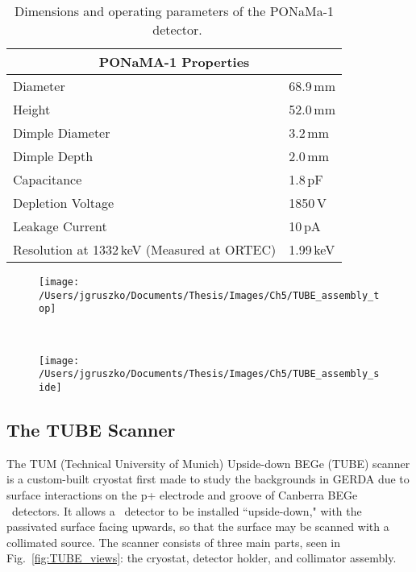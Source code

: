 \begin{table}[]
\centering
\begin{tabular}{p{5cm} | l}
\hline
\multicolumn{2}{c}{PONaMA-1 Properties} \\
\hline
Diameter & 68.9\,mm \\ 
Height & 52.0\,mm \\ 
Dimple Diameter & 3.2\,mm \\
Dimple Depth & 2.0\,mm \\
Capacitance & 1.8\,pF \\
Depletion Voltage & 1850\,V \\
Leakage Current & 10\,pA \\
Resolution at 1332\,keV \newline (Measured at ORTEC) & 1.99\,keV \\
\end{tabular}
\caption{Dimensions and operating parameters of the PONaMa-1 \ppc\ detector.}
 \label{tab:PONaMA_specs}
\end{table}

\begin{figure*}[p]
 \centering
  \begin{subfigure}[]{\textwidth}
  \centering
 \texttt{[image: /Users/jgruszko/Documents/Thesis/Images/Ch5/TUBE\_assembly\_top]}
 \label{fig:TUBE_top}
\end{subfigure}
  ~
  \begin{subfigure}[]{\textwidth}
   \centering
 \texttt{[image: /Users/jgruszko/Documents/Thesis/Images/Ch5/TUBE\_assembly\_side]}
 \label{fig:TUBE_side}
 \end{subfigure}
\caption[A diagram of the TUBE scanner]{Simplified top {\it (top)} and bisected views {\it (bottom)} of the TUBE scanner, showing key dimensions. The thermal braids connecting the IR umbrella to the IR cup and the mylar covering of the IR umbrella are not shown. Details of the detector cup, front-end electronics, and cold-finger are also removed for clarity.}
\label{fig:TUBE_views}
\end{figure*}

\subsection{The TUBE Scanner}
The TUM (Technical University of Munich) Upside-down BEGe (TUBE) scanner is a custom-built cryostat first made to study the backgrounds in GERDA due to surface interactions on the p+ electrode and groove of Canberra BEGe \ppc\ detectors. It allows a \ppc\ detector to be installed ``upside-down," with the passivated surface facing upwards, so that the surface may be scanned with a collimated source. The scanner consists of three main parts, seen in Fig.~\ref{fig:TUBE_views}: the cryostat, detector holder, and collimator assembly. 

